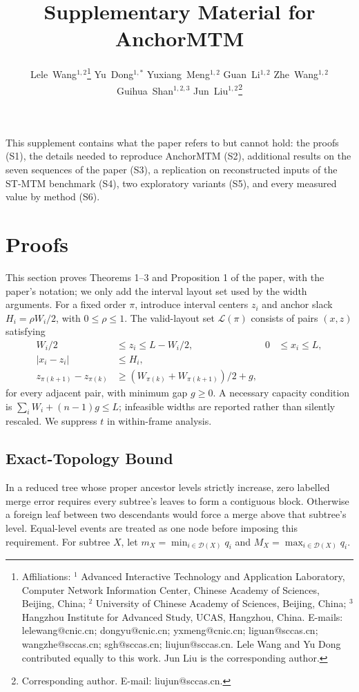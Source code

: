 \documentclass[preprint]{vgtc}   %
\title{Supplementary Material for AnchorMTM}
\author{%
Lele~Wang$^{1,2}$\thanks{%
Affiliations:
$^{1}$ Advanced Interactive Technology and Application Laboratory, Computer Network Information Center, Chinese Academy of Sciences, Beijing, China;
$^{2}$ University of Chinese Academy of Sciences, Beijing, China;
$^{3}$ Hangzhou Institute for Advanced Study, UCAS, Hangzhou, China.
E-mails: lelewang@cnic.cn; dongyu@cnic.cn; yxmeng@cnic.cn;
liguan@sccas.cn; wangzhe@sccas.cn; sgh@sccas.cn;
liujun@sccas.cn.
Lele Wang and Yu Dong contributed equally to this work.
Jun Liu is the corresponding author.}%
\quad
Yu~Dong$^{1,*}$%
\quad
Yuxiang~Meng$^{1,2}$%
\quad
Guan~Li$^{1,2}$%
\quad
Zhe~Wang$^{1,2}$%
\quad
Guihua~Shan$^{1,2,3}$%
\quad
Jun~Liu$^{1,2}$\thanks{Corresponding author. E-mail: liujun@sccas.cn.}
}
\begin{document}
\setcounter{section}{-1}
\maketitle
This supplement contains what the paper refers to but cannot hold: the proofs (S1), the details needed to reproduce AnchorMTM (S2), additional results on the seven sequences of the paper (S3), a replication on reconstructed inputs of the ST-MTM benchmark (S4), two exploratory variants (S5), and every measured value by method (S6).

\section{Proofs}\label{sec:proofs}
This section proves Theorems 1--3 and Proposition 1 of the paper, with the paper's notation; we only add the interval layout set used by the width arguments. For a fixed order $\pi$, introduce interval centers $z_i$ and anchor slack $H_i=\rho W_i/2$, with $0\le\rho\le1$. The valid-layout set $\mathcal{L}(\pi)$ consists of pairs $(x,z)$ satisfying
\begin{equation}\label{eq:layout}
\begin{aligned}
 W_i/2&\le z_i\le L-W_i/2, &0&\le x_i\le L,\\
 |x_i-z_i|&\le H_i,\\
 z_{\pi(k+1)}-z_{\pi(k)}&\ge
 (W_{\pi(k)}+W_{\pi(k+1)})/2+g,
\end{aligned}
\end{equation}
for every adjacent pair, with minimum gap $g\ge0$. A necessary capacity condition is $\sum_i W_i+(n-1)g\le L$; infeasible widths are reported rather than silently rescaled. We suppress $t$ in within-frame analysis.

\subsection{Exact-Topology Bound}\label{sec:exact}
In a reduced tree whose proper ancestor levels strictly increase, zero labelled merge error requires every subtree's leaves to form a contiguous block. Otherwise a foreign leaf between two descendants would force a merge above that subtree's level. Equal-level events are treated as one node before imposing this requirement. For subtree $X$, let $m_X=\min_{i\in\mathcal{D}(X)}q_i$ and $M_X=\max_{i\in\mathcal{D}(X)}q_i$.
\end{document}
